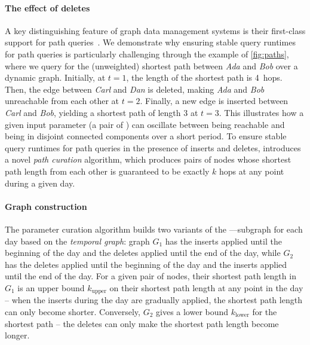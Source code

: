 \paragraph{The effect of deletes}
%
A key distinguishing feature of graph data management systems is their first-class support for path queries~\cite{DBLP:journals/csur/AnglesABHRV17}.
We demonstrate why ensuring stable query runtimes for path queries is particularly challenging through the example of \autoref{fig:paths}, where we query for the (unweighted) shortest path between \emph{Ada} and \emph{Bob} over a dynamic graph.
Initially, at $t = 1$, the length of the shortest path is 4~hops.
Then, the edge between \emph{Carl} and \emph{Dan} is deleted, making \emph{Ada} and \emph{Bob} unreachable from each other at $t = 2$.
Finally, a new edge is inserted between \emph{Carl} and \emph{Bob}, yielding a shortest path of length 3 at $t = 3$.
This illustrates how a given input parameter (a pair of \Persons) can oscillate between being reachable and being in disjoint connected components over a short period.
To ensure stable query runtimes for path queries in the presence of inserts and deletes, \interactivevtwo introduces a novel \emph{path curation} algorithm, which produces pairs of \Person nodes whose shortest path length from each other is guaranteed to be exactly $k$ hops at any point during a given day.

\paragraph{Graph construction}
%
The parameter curation algorithm builds two variants of the \Person--\knows--\Person subgraph for each day based on the \emph{temporal graph}:
graph $G_1$ has the inserts applied until the beginning of the day and the deletes applied until the end of the day,
while $G_2$ has the deletes applied until the beginning of the day and the inserts applied until the end of the day.
For a given pair of \Person nodes, their shortest path length in $G_1$ is an upper bound $k_\mathrm{upper}$ on their shortest path length at any point in the day -- when the inserts during the day are gradually applied, the shortest path length can only become shorter.
Conversely, $G_2$ gives a lower bound $k_\mathrm{lower}$ for the shortest path -- the deletes can only make the shortest path length become longer.

